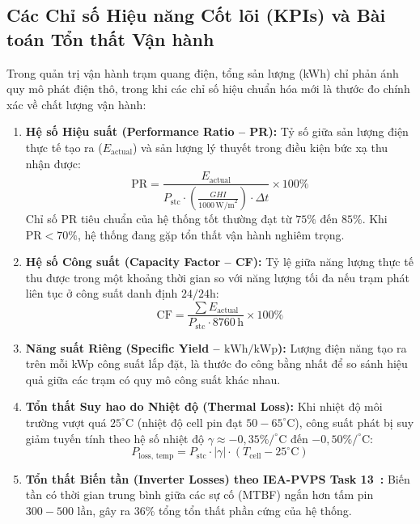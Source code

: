 \documentclass[12pt, a4paper]{report}
\begin{document}
\subsection{Các Chỉ số Hiệu năng Cốt lõi (KPIs) và Bài toán Tổn thất Vận hành}
Trong quản trị vận hành trạm quang điện, tổng sản lượng (kWh) chỉ phản ánh quy mô phát điện thô, trong khi các chỉ số hiệu chuẩn hóa mới là thước đo chính xác về chất lượng vận hành:
\begin{enumerate}[label=\arabic*., leftmargin=*]
    \item \textbf{Hệ số Hiệu suất (Performance Ratio -- PR):} Tỷ số giữa sản lượng điện thực tế tạo ra ($E_{\text{actual}}$) và sản lượng lý thuyết trong điều kiện bức xạ thu nhận được:
    \begin{equation}
        \text{PR} = \frac{E_{\text{actual}}}{P_{\text{stc}} \cdot \left(\frac{GHI}{1000\,\text{W/m}^2}\right) \cdot \Delta t} \times 100\%
    \end{equation}
    Chỉ số PR tiêu chuẩn của hệ thống tốt thường đạt từ $75\%$ đến $85\%$. Khi $\text{PR} < 70\%$, hệ thống đang gặp tổn thất vận hành nghiêm trọng.
    
    \item \textbf{Hệ số Công suất (Capacity Factor -- CF):} Tỷ lệ giữa năng lượng thực tế thu được trong một khoảng thời gian so với năng lượng tối đa nếu trạm phát liên tục ở công suất danh định $24/24\text{h}$:
    \begin{equation}
        \text{CF} = \frac{\sum E_{\text{actual}}}{P_{\text{stc}} \cdot 8760\,\text{h}} \times 100\%
    \end{equation}
    
    \item \textbf{Năng suất Riêng (Specific Yield -- $\text{kWh/kWp}$):} Lượng điện năng tạo ra trên mỗi kWp công suất lắp đặt, là thước đo công bằng nhất để so sánh hiệu quả giữa các trạm có quy mô công suất khác nhau.

    \item \textbf{Tổn thất Suy hao do Nhiệt độ (Thermal Loss):} Khi nhiệt độ môi trường vượt quá $25^\circ\text{C}$ (nhiệt độ cell pin đạt $50-65^\circ\text{C}$), công suất phát bị suy giảm tuyến tính theo hệ số nhiệt độ $\gamma \approx -0{,}35\%/^\circ\text{C}$ đến $-0{,}50\%/^\circ\text{C}$:
    \begin{equation}
        P_{\text{loss, temp}} = P_{\text{stc}} \cdot |\gamma| \cdot (T_{\text{cell}} - 25^\circ\text{C})
    \end{equation}
    
    \item \textbf{Tổn thất Biến tần (Inverter Losses) theo IEA-PVPS Task 13~\cite{iea2023pvps}:} Biến tần có thời gian trung bình giữa các sự cố (MTBF) ngắn hơn tấm pin $300-500$ lần, gây ra 36\% tổng tổn thất phần cứng của hệ thống.
\end{enumerate}
\end{document}
